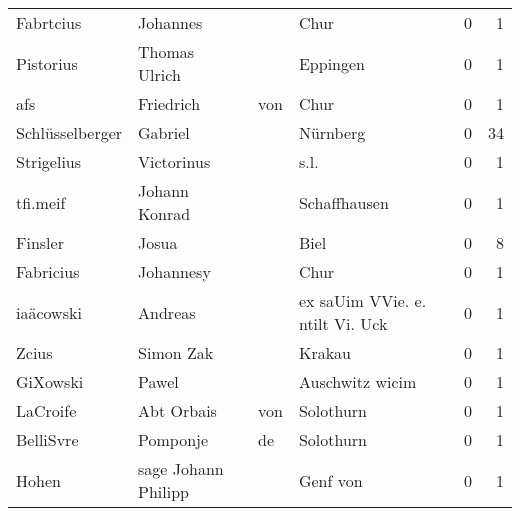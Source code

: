 \begin{center}
\begin{tiny}
\begin{longtabu}{llllrr}
                Fabrtcius &                           Johannes &             &                                        Chur &          0 &         1 \\
                Pistorius &                      Thomas Ulrich &             &                                    Eppingen &          0 &         1 \\
                      afs &                          Friedrich &         von &                                        Chur &          0 &         1 \\
          Schlüsselberger &                            Gabriel &             &                                    Nürnberg &          0 &        34 \\
               Strigelius &                         Victorinus &             &                                        s.l. &          0 &         1 \\
                 tfi.meif &                      Johann Konrad &             &                                Schaffhausen &          0 &         1 \\
                  Finsler &                              Josua &             &                                        Biel &          0 &         8 \\
                Fabricius &                          Johannesy &             &                                        Chur &          0 &         1 \\
                iaäcowski &                            Andreas &             &             ex saUim VVie. e. ntilt Vi. Uck &          0 &         1 \\
                    Zcius &                          Simon Zak &             &                                      Krakau &          0 &         1 \\
                 GiXowski &                              Pawel &             &                             Auschwitz wicim &          0 &         1 \\
                 LaCroife &                        Abt  Orbais &         von &                                   Solothurn &          0 &         1 \\
                BelliSvre &                           Pomponje &          de &                                   Solothurn &          0 &         1 \\
                    Hohen &                sage Johann Philipp &             &                                    Genf von &          0 &         1 \\

\end{longtabu}
\end{tiny}
\end{center}
